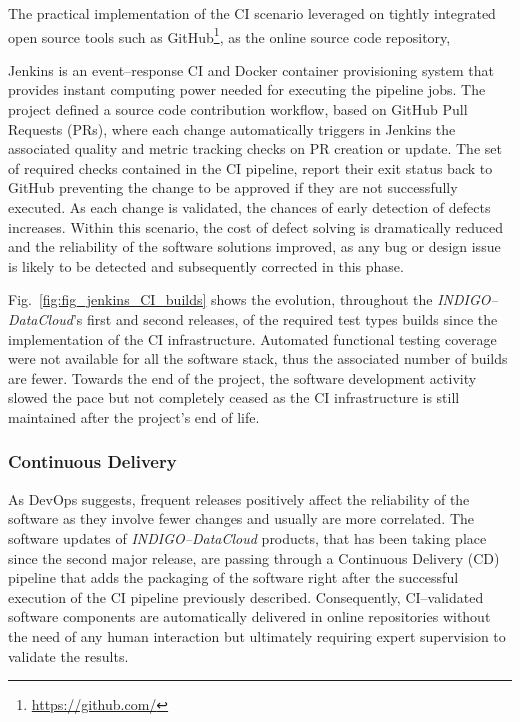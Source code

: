 \documentclass[journal]{IEEEtran}
\begin{document}
The practical implementation of the CI scenario leveraged on tightly integrated open
source tools such as GitHub\footnote{\url{https://github.com/}}, as the online source code repository,

Jenkins is an event--response CI and Docker container
provisioning system that provides instant computing power needed for executing the pipeline jobs.
The project defined a source code contribution workflow, based on GitHub Pull Requests
(PRs), where each change automatically triggers in Jenkins the associated quality and
metric tracking checks on PR creation or update. The set of required checks contained
in the CI pipeline, report their exit status back to GitHub preventing the change to be
approved if they are not successfully executed. As each change is validated, the chances
of early detection of defects increases. Within this scenario, the cost of defect solving
is dramatically reduced and the reliability of the software solutions improved, as any
bug or design issue is likely to be detected and subsequently corrected in this phase.

Fig.~\ref{fig:fig_jenkins_CI_builds} shows the evolution, throughout the
{\sl INDIGO--DataCloud}'s first and second releases, of the required test types builds since the
implementation of the CI infrastructure. Automated functional testing coverage were not
available for all the software stack, thus the associated number of builds are fewer. Towards the
end of the project, the software development activity slowed the pace but not completely ceased
as the CI infrastructure is still maintained after the project's end of life.

\subsubsection{Continuous Delivery}
As DevOps suggests, frequent releases positively affect the reliability of the software as
they involve fewer changes and usually are more correlated. The software updates of
{\sl INDIGO--DataCloud} products, that has been taking place since the second major release, are passing through
a Continuous Delivery (CD) pipeline that adds the packaging of the software right after the
successful execution of the CI pipeline previously described. Consequently, CI--validated
software components are automatically delivered in online repositories without the need of
any human interaction but ultimately requiring expert supervision to validate the results.
\end{document}
